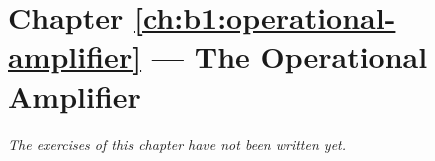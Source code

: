\section*{Chapter \ref{ch:b1:operational-amplifier} --- The Operational Amplifier}


\emph{The exercises of this chapter have not been written yet.}
